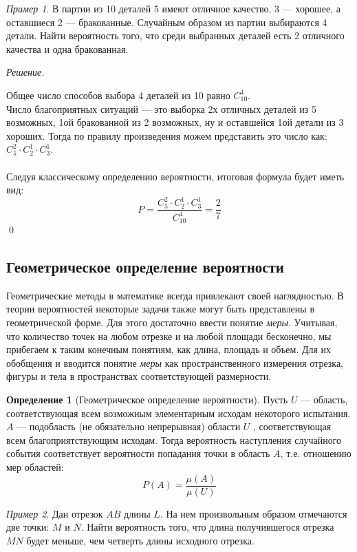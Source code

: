 \documentclass[12pt,a4paper]{article}
\theoremstyle{definition}
\newtheorem{definition}{Определение}[section]
\theoremstyle{definition}
\theoremstyle{remark}
\theoremstyle{corollary}
\theoremstyle{bolditalic}
\newtheorem{example}{Пример}[section]
\newenvironment{solution}{
    \vspace{0.5em}
    \noindent\textit{Решение.}
}{\qed\vspace{1em}}
\begin{document}
\begin{example}
    В партии из 10 деталей 5 имеют отличное качество, 3 --- хорошее, а оставшиеся 2 --- бракованные. Случайным образом из партии выбираются 4 детали. Найти вероятность того, что среди выбранных деталей есть 2 отличного качества и одна бракованная.
\end{example}

\begin{solution}
    Общее число способов выбора 4 деталей из 10 равно $C_{10}^4$.\\
    Число благоприятных ситуаций --- это выборка 2х отличных деталей из 5 возможных, 1ой бракованной из 2 возможных, ну и оставшейся 1ой детали из 3 хороших. Тогда по правилу произведения можем представить это число как: $C_5^2\cdot C_2^1 \cdot C_3^1$.\\\\
    Следуя классическому определению вероятности, итоговая формула будет иметь вид:
    \[
    P = \frac{C_5^2\cdot C_2^1 \cdot C_3^1}{C_{10}^4} = \frac{2}{7}
    \]
\end{solution}

\subsection{Геометрическое определение вероятности}

Геометрические методы в математике всегда привлекают своей наглядностью. В теории вероятностей некоторые задачи также могут быть представлены в геометрической форме. Для этого достаточно ввести понятие \textit{меры}. Учитывая, что количество точек на любом отрезке и на любой площади бесконечно, мы прибегаем к таким конечным понятиям, как длина, площадь и объем. Для их обобщения и вводится понятие \textit{меры} как пространственного измерения отрезка, фигуры и тела в пространствах соответствующей размерности.

\begin{definition}[Геометрическое определение вероятности]
    Пусть $U$ --- область, соответствующая всем возможным элементарным исходам некоторого испытания. $A$ --- подобласть (не обязательно непрерывная) области $U$ , соответствующая всем благоприятствующим исходам. Тогда вероятность наступления случайного события соответствует вероятности попадания точки в область $A$, т.е. отношению мер областей:
    \[
    P(A) = \frac{\mu(A)}{\mu(U)}
    \]
\end{definition}

\begin{example}
    Дан отрезок $AB$ длины $L$. На нем произвольным образом отмечаются две точки: $M$ и $N$. Найти вероятность того, что длина получившегося отрезка $MN$ будет меньше, чем четверть длины исходного отрезка. 
\end{example}
\end{document}
